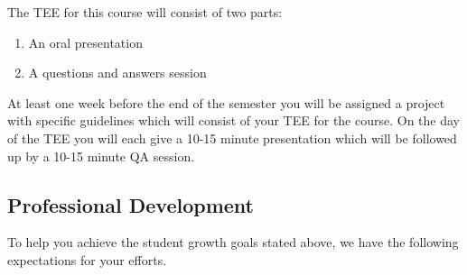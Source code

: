 \documentclass[11pt]{article}
\theoremstyle{plain}
\theoremstyle{definition}
\begin{document}
The TEE for this course will consist of two parts:
\begin{enumerate}[1)]
\item An oral presentation
\item A questions and answers session
\end{enumerate}

At least one week before the end of the semester you will be assigned a project with specific guidelines which will consist of your TEE for the course. On the day of the TEE  you will each give a 10-15 minute presentation which will be followed up by a 10-15 minute QA session. 

\subsection{Professional Development}

To help you achieve the student growth goals stated above, we have the following expectations for your efforts.  
\end{document}

